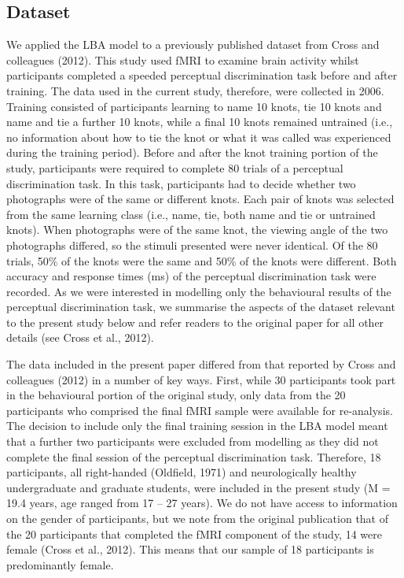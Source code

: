 \documentclass[
  man, donotrepeattitle,floatsintext]{apa6}
\begin{document}
\subsection{Dataset}\label{dataset}

We applied the LBA model to a previously published dataset from Cross and colleagues (2012). This study used fMRI to examine brain activity whilst participants completed a speeded perceptual discrimination task before and after training. The data used in the current study, therefore, were collected in 2006. Training consisted of participants learning to name 10 knots, tie 10 knots and name and tie a further 10 knots, while a final 10 knots remained untrained (i.e., no information about how to tie the knot or what it was called was experienced during the training period). Before and after the knot training portion of the study, participants were required to complete 80 trials of a perceptual discrimination task. In this task, participants had to decide whether two photographs were of the same or different knots. Each pair of knots was selected from the same learning class (i.e., name, tie, both name and tie or untrained knots). When photographs were of the same knot, the viewing angle of the two photographs differed, so the stimuli presented were never identical. Of the 80 trials, 50\% of the knots were the same and 50\% of the knots were different. Both accuracy and response times (ms) of the perceptual discrimination task were recorded. As we were interested in modelling only the behavioural results of the perceptual discrimination task, we summarise the aspects of the dataset relevant to the present study below and refer readers to the original paper for all other details (see Cross et al., 2012).

The data included in the present paper differed from that reported by Cross and colleagues (2012) in a number of key ways. First, while 30 participants took part in the behavioural portion of the original study, only data from the 20 participants who comprised the final fMRI sample were available for re-analysis. The decision to include only the final training session in the LBA model meant that a further two participants were excluded from modelling as they did not complete the final session of the perceptual discrimination task. Therefore, 18 participants, all right-handed (Oldfield, 1971) and neurologically healthy undergraduate and graduate students, were included in the present study (M = 19.4 years, age ranged from 17 -- 27 years). We do not have access to information on the gender of participants, but we note from the original publication that of the 20 participants that completed the fMRI component of the study, 14 were female (Cross et al., 2012). This means that our sample of 18 participants is predominantly female.
\end{document}
